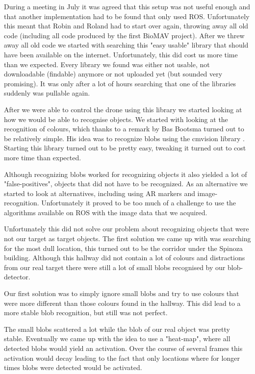 \documentclass[a4paper,10pt]{article}
\begin{document}
During a meeting in July it was agreed that this setup was not useful enough and that another implementation had to be found that only used ROS. 
Unfortunately this meant that Robin and Roland had to start over again, throwing away all old code (including all code produced by the first BioMAV project).  
After we threw away all old code we started with searching this "easy usable" library that should have been available on the internet. 
Unfortunately, this did cost us more time than we expected.
Every library we found was either not usable, not downloadable (findable) anymore or not uploaded yet (but sounded very promising). 
It was only after a lot of hours searching that one of the libraries suddenly was pullable again. 

After we were able to control the drone using this library we started looking at how we would be able to recognise objects. 
We started with looking at the recognition of colours, which thanks to a remark by Bas Bootsma turned out to be relatively simple. 
His idea was to recognize blobs using the cmvision library \cite{cmvision}. 
Starting this library turned out to be pretty easy, tweaking it turned out to cost more time than expected. 

Although recognizing blobs worked for recognizing objects it also yielded a lot of "false-positives", objects that did not have to be recognized.
As an alternative we started to look at alternatives, including using AR markers and image-recognition. 
Unfortunately it proved to be too much of a challenge to use the algorithms available on ROS with the image data that we acquired. 

Unfortunately this did not solve our problem about recognizing objects that were not our target as target objects.
The first solution we came up with was searching for the most dull location, this turned out to be the corridor under the Spinoza building. 
Although this hallway did not contain a lot of colours and distractions from our real target there were still a lot of small blobs recognised by our blob-detector. 

Our first solution was to simply ignore small blobs and try to use colours that were more different than those colours found in the hallway. 
This did lead to a more stable blob recognition, but still was not perfect. 

The small blobs scattered a lot while the blob of our real object was pretty stable. 
Eventually we came up with the idea to use a "heat-map", where all detected blobs would yield an activation. 
Over the course of several frames this activation would decay leading to the fact that only locations where for longer times blobs were detected would be activated. 
\end{document}
